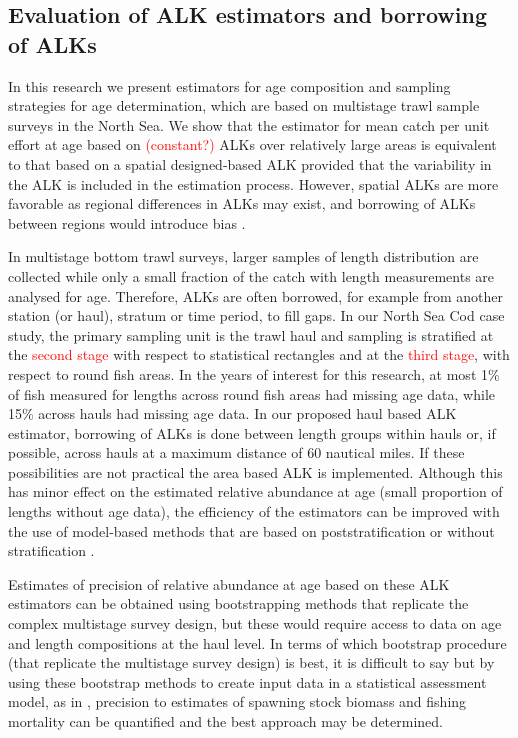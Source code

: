 \documentclass[a4paper 12pt]{article}
\numberwithin{equation}{section}
\newcommand{\ed}[1]{\textcolor{red}{#1}}
\begin{document}
\subsection*{\normalsize Evaluation of ALK estimators and borrowing of ALKs}
In this research we present estimators for age composition and sampling strategies for age determination, which are based on multistage trawl sample surveys in the North Sea. We show that the estimator for mean catch per unit effort at age based on \ed{(constant?)} ALKs over relatively large areas is equivalent to that based on a spatial designed-based ALK provided that the variability in the ALK is included in the estimation process. However, spatial ALKs \citep{berg2012spatial, gerritsen2006simple, hirst2012bayesian} are more favorable as regional differences in ALKs may exist, and borrowing of ALKs between regions would introduce bias  \citep{aanes2015efficient,kimura1977statistical}. 

In multistage bottom trawl surveys, larger samples of length distribution are collected while only a small fraction of the catch with length measurements are analysed for age. Therefore, ALKs are often borrowed, for example from another station (or haul), stratum or time period, to fill gaps. In our North Sea Cod case study, the primary sampling unit is the trawl haul and sampling is stratified at the \ed{second stage} with respect to statistical rectangles and at the \ed{third stage}, with respect to round fish areas. In the years of interest for this research, at most 1\%  of fish measured for lengths across round fish areas had missing age data, while 15\% across hauls had missing age data. In our proposed haul based ALK estimator, borrowing of ALKs is done between length groups within hauls or, if possible, across hauls at a maximum distance of 60 nautical miles. If these possibilities are not practical the area based ALK is implemented. Although this has minor effect on the estimated relative abundance at age (small proportion of lengths without age data), the efficiency of the estimators can be improved with the use of model-based methods that are based on poststratification \citep{holt1979post, valliant1993poststratification} or without stratification \citep{berg2012spatial, berg2014evaluation}.  

Estimates of precision of relative abundance at age based on these ALK estimators can be obtained using bootstrapping methods that replicate the complex multistage survey design, but these would require access to data on age and length compositions at the haul level. In terms of which bootstrap procedure (that replicate the multistage survey design) is best, it is difficult to say but by using these bootstrap methods to create input data in a statistical assessment model, as in \citep{berg2014evaluation}, precision to estimates of spawning stock biomass and fishing mortality can be quantified and the best approach may be determined.
\end{document}
